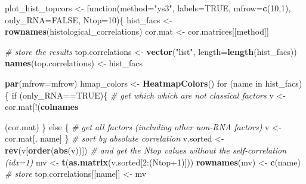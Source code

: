 \documentclass[]{article}
\newenvironment{Shaded}{\begin{snugshade}}{\end{snugshade}}
\newcommand{\KeywordTok}[1]{\textcolor[rgb]{0.13,0.29,0.53}{\textbf{{#1}}}}
\newcommand{\DataTypeTok}[1]{\textcolor[rgb]{0.13,0.29,0.53}{{#1}}}
\newcommand{\DecValTok}[1]{\textcolor[rgb]{0.00,0.00,0.81}{{#1}}}
\newcommand{\StringTok}[1]{\textcolor[rgb]{0.31,0.60,0.02}{{#1}}}
\newcommand{\CommentTok}[1]{\textcolor[rgb]{0.56,0.35,0.01}{\textit{{#1}}}}
\newcommand{\OtherTok}[1]{\textcolor[rgb]{0.56,0.35,0.01}{{#1}}}
\newcommand{\NormalTok}[1]{{#1}}
\begin{document}
\begin{Shaded}
\begin{Highlighting}[]
\NormalTok{plot_hist_topcors <-}\StringTok{ }\NormalTok{function(}\DataTypeTok{method=}\StringTok{"ys3"}\NormalTok{, }\DataTypeTok{labels=}\OtherTok{TRUE}\NormalTok{, }\DataTypeTok{mfrow=}\KeywordTok{c}\NormalTok{(}\DecValTok{10}\NormalTok{,}\DecValTok{1}\NormalTok{), }
                              \DataTypeTok{only_RNA=}\OtherTok{FALSE}\NormalTok{, }\DataTypeTok{Ntop=}\DecValTok{10}\NormalTok{)\{}
  \NormalTok{hist_facs <-}\StringTok{ }\KeywordTok{rownames}\NormalTok{(histological_correlations)}
  \NormalTok{cor.mat <-}\StringTok{ }\NormalTok{cor.matrices[[method]]}
  
  \CommentTok{# store the results}
  \NormalTok{top.correlations <-}\StringTok{ }\KeywordTok{vector}\NormalTok{(}\StringTok{"list"}\NormalTok{, }\DataTypeTok{length=}\KeywordTok{length}\NormalTok{(hist_facs))}
  \KeywordTok{names}\NormalTok{(top.correlations) <-}\StringTok{ }\NormalTok{hist_facs}
  
  \KeywordTok{par}\NormalTok{(}\DataTypeTok{mfrow=}\NormalTok{mfrow)}
  \NormalTok{hmap_colors <-}\StringTok{ }\KeywordTok{HeatmapColors}\NormalTok{()}
  \NormalTok{for (name in hist_facs)\{}
    \NormalTok{if (only_RNA==}\OtherTok{TRUE}\NormalTok{)\{}
      \CommentTok{# get which which are not classical factors}
      \NormalTok{v <-}\StringTok{ }\NormalTok{cor.mat[!(}\KeywordTok{colnames}\NormalTok{(cor.mat) %in%}\StringTok{ }\NormalTok{hist_facs), name]  }
    \NormalTok{\} else \{}
      \CommentTok{# get all factors (including other non-RNA factors)}
      \NormalTok{v <-}\StringTok{ }\NormalTok{cor.mat[, name]  }
    \NormalTok{\}}
    \CommentTok{# sort by absolute correlation}
    \NormalTok{v.sorted <-}\StringTok{ }\KeywordTok{rev}\NormalTok{(v[}\KeywordTok{order}\NormalTok{(}\KeywordTok{abs}\NormalTok{(v))])}
    \CommentTok{# and get the Ntop values without the self-correlation (idx=1)}
    \NormalTok{mv <-}\StringTok{ }\KeywordTok{t}\NormalTok{(}\KeywordTok{as.matrix}\NormalTok{(v.sorted[}\DecValTok{2}\NormalTok{:(Ntop}\DecValTok{+1}\NormalTok{)]))}
    \KeywordTok{rownames}\NormalTok{(mv) <-}\StringTok{ }\KeywordTok{c}\NormalTok{(name)}
    \CommentTok{# store}
    \NormalTok{top.correlations[[name]] <-}\StringTok{ }\NormalTok{mv}

}
\end{Highlighting}
\end{Shaded}
\end{document}
